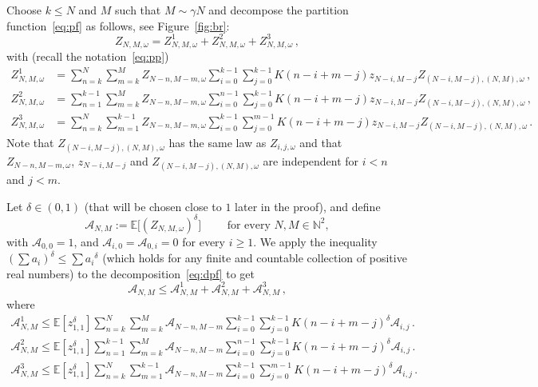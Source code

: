 \documentclass[10pt]{amsart}
\theoremstyle{definition}\newtheorem{defi}[theo]{Definition}\newtheorem{rema}[theo]{Remark}\newtheorem{exam}[theo]{Example}\newtheorem{exem}[theo]{Example}\newtheorem{nota}[theo]{Notation}
\newcommand{\cA}{\ensuremath{\mathcal{A}}}
\newcommand{\bbE}{\ensuremath{\mathbb{E}}}
\newcommand{\bbN}{\ensuremath{\mathbb{N}}}
\begin{document}
Choose $k \le N$ and $M $ such that $M \sim \gamma N $ and decompose the partition function~\eqref{eq:pf} as follows, see Figure~\ref{fig:br}:
\begin{equation}\label{eq:dpf}
Z_{N,M,\omega}= Z_{N,M,\omega}^1 + Z_{N,M,\omega}^2 + Z_{N,M,\omega}^3\,,
\end{equation}
with (recall the notation~\eqref{eq:pp})
\[
\begin{split}
Z_{N,M,\omega}^1 &= \sum_{n=k}^N \sum_{m=k}^M Z_{N-n,M-m,\omega} \sum_{i=0}^{k-1} \sum_{j=0}^{k-1} K(n-i+m-j) z_{N-i,M-j} Z_{(N-i,M-j),(N,M),\omega}\,,\\
Z_{N,M,\omega}^2 &= \sum_{n=1}^{k-1} \sum_{m=k}^M Z_{N-n,M-m,\omega} \sum_{i=0}^{n-1} \sum_{j=0}^{k-1} K(n-i+m-j) z_{N-i,M-j} Z_{(N-i,M-j),(N,M),\omega}\,,\\
Z_{N,M,\omega}^3&= \sum_{n=k}^N \sum_{m=1}^{k-1} Z_{N-n,M-m,\omega} \sum_{i=0}^{k-1} \sum_{j=0}^{m-1} K(n-i+m-j) z_{N-i,M-j} Z_{(N-i,M-j),(N,M),\omega}\,.
\end{split}
\]
Note that $Z_{(N-i,M-j),(N,M),\omega}$ has the same law as $Z_{i,j,\omega}$ and that $Z_{N-n,M-m,\omega}$, $ z_{N-i,M-j}$ and $Z_{(N-i,M-j),(N,M),\omega}$ are independent for $i < n$ and $j <m$.


Let $\delta \in (0,1)$ (that will be chosen close to $1$ later in the proof), and define
\begin{equation}
\cA_{N,M} := \bbE \Big[{\left(Z_{N,M,\omega} \right)}^{\delta} \Big] \qquad \text{ for every } N,M \in \bbN^2,
\end{equation}
with $\cA_{0,0}=1$, and $\cA_{i,0}= \cA_{0,i}=0$ for every $i\ge 1$. We apply the inequality ${ \left(\sum a_i \right) }^\delta \le \sum {a_i}^\delta$ (which holds for any finite and countable collection of positive real numbers) to the decomposition~\eqref{eq:dpf} to get
\begin{equation}\label{eq:A123}
\cA_{N,M} \le \cA_{N,M}^1 + \cA_{N,M}^2 + \cA_{N,M}^3\,,
\end{equation}
where
\begin{equation}
\begin{split}
\cA_{N,M}^1 \le \bbE[z_{1,1}^\delta] \sum_{n=k}^N \sum_{m=k}^M \cA_{N-n,M-m} \sum_{i=0}^{k-1} \sum_{j=0}^{k-1} K(n-i+m-j)^\delta \cA_{i,j}\,.\\
\cA_{N,M}^2 \le \bbE[z_{1,1}^\delta] \sum_{n=1}^{k-1} \sum_{m=k}^M \cA_{N-n,M-m} \sum_{i=0}^{n-1} \sum_{j=0}^{k-1} K(n-i+m-j)^\delta \cA_{i,j}\,.\\
\cA_{N,M}^3 \le \bbE[z_{1,1}^\delta] \sum_{n=k}^N \sum_{m=1}^{k-1} \cA_{N-n,M-m} \sum_{i=0}^{k-1} \sum_{j=0}^{m-1} K(n-i+m-j)^\delta \cA_{i,j}\,.
\end{split}
\end{equation}
\end{document}
